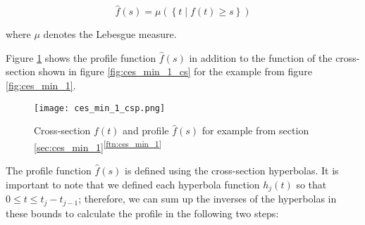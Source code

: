 $$\hat{f}(s) = \mu(\left\{ t \mid f(t) \geq s \right\})$$

where $\mu$ denotes the Lebesgue measure.\cite{rotelex}

Figure \ref{fig:ces_min_1_csp} shows the profile function $\hat{f}(s)$ in addition to the function of the cross-section shown in figure \ref{fig:ces_min_1_cs} for the example from figure \ref{fig:ces_min_1}.

 \begin{figure}[H]
    \centering
    
    \texttt{[image: ces\_min\_1\_csp.png]}
		
	\caption{Cross-section $f(t)$ and profile $\hat{f}(s)$ for example from section \ref{sec:ces_min_1}\textsuperscript{\ref{ftn:ces_min_1}}}
    \label{fig:ces_min_1_csp}
\end{figure}

The profile function $\hat{f}(s)$ is defined using the cross-section hyperbolas. It is important to note that we defined each hyperbola function $h_j(t)$ so that $0 \leq t \leq t_j - t_{j-1}$; therefore, we can sum up the inverses of the hyperbolas in these bounds to calculate the profile in the following two steps:

